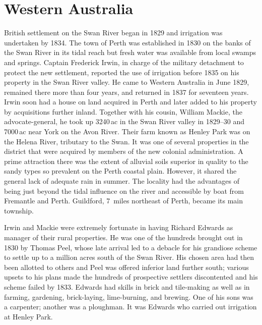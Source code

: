 \section*{Western Australia}

British settlement on the Swan River began in 1829
and irrigation was undertaken by 1834.  The town of Perth
was established in 1830 on the banks of the Swan River in its tidal
reach but fresh water was available from local swamps and springs.
Captain Frederick Irwin, in charge of the military
detachment to protect the new settlement, reported the use of
irrigation before 1835 on his property in the Swan River valley.  He
came to Western Australia in June 1829, remained there more than four
years, and returned in 1837 for seventeen years.  Irwin soon had a
house on land acquired in Perth and later added to his property by
acquisitions further inland.  Together with his cousin, William
Mackie, the advocate-general, he took up 3240\,ac in
the Swan River valley in 1829--30 and 7000\,ac near York on the Avon
River. Their farm known as Henley Park was on the Helena River, tributary to the
Swan.  It was one of several properties in the district that were
acquired by members of the new colonial administration.  A prime
attraction there was the extent of alluvial soils superior in quality
to the sandy types so prevalent on the Perth coastal plain.  However,
it shared the general lack of adequate rain in summer.  The locality
had the advantages of being just beyond the tidal influence on the
river and accessible by boat from Fremantle  and
Perth.  Guildford, 7~miles northeast of Perth, became
its main township.

Irwin and Mackie were extremely fortunate in having Richard
Edwards as manager of their rural properties.  He
was one of the hundreds brought out in 1830 by Thomas
Peel, whose late arrival led to a debacle for his
grandiose scheme to settle up to a million acres south of the Swan
River.  His chosen area had then been allotted to others and Peel was
offered inferior land further south; various upsets to his plans made
the hundreds of prospective settlers discontented and his scheme
failed by 1833.  Edwards had skills in brick and tile-making as well
as in farming, gardening, brick-laying, lime-burning, and brewing.
One of his sons was a carpenter; another was a ploughman.  It was
Edwards who carried out irrigation at Henley Park.

